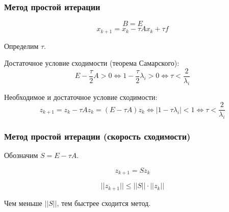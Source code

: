 \documentclass[10pt]{beamer}
\begin{document}
\begin{frame}[fragile]
\frametitle{Метод простой итерации}

\vfill
$$B = E$$
$$ x_{k+1} = x_k - \tau A x_k + \tau f$$

Определим $\tau$.
\vfill

Достаточное условие сходимости (теорема Самарского):
$$ E - \frac{\tau}{2} A > 0 \Leftrightarrow 1 - \frac{\tau}{2} \lambda_i > 0 \Leftrightarrow \tau < \frac{2}{\lambda_i}$$

Необходимое и достаточное условие сходимости:
$$ z_{k+1} = z_k - \tau A z_k = (E - \tau A) z_k \Leftrightarrow |1 - \tau \lambda_i| < 1 \Leftrightarrow \tau < \frac{2}{\lambda_i}$$
\end{frame}

\begin{frame}[fragile]
\frametitle{Метод простой итерации (скорость сходимости)}

Обозначим $S  = E - \tau A$.

$$ z_{k+1} = S z_k $$

$$ ||z_{k+1}|| \leqslant ||S|| \cdot ||z_k|| $$

Чем меньше $||S||$, тем быстрее сходится метод. 
\end{frame}
\end{document}
